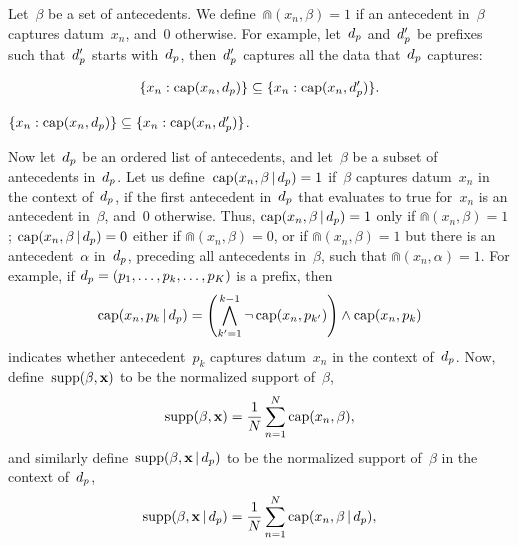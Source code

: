 Let~$\beta$ be a set of antecedents.
%
We define~${\Cap(x_n, \beta) = 1}$ if an antecedent in~$\beta$
captures datum~$x_n$, and~0 otherwise.
%
For example, let~$d_p$ and~$d_p'$ be prefixes such that~$d_p'$ starts
with~$d_p$, then~$d_p'$ captures all the data that~$d_p$ captures:
\begin{arxiv}
\begin{align}
\{x_n: \textnormal{cap}(x_n, d_p)\} \subseteq \{x_n: \textnormal{cap}(x_n, d_p')\}.
\label{eq:cap-subset}
\end{align}
\end{arxiv}
\begin{kdd}
${\{x_n: \textnormal{cap}(x_n, d_p)\} \subseteq \{x_n: \textnormal{cap}(x_n, d_p')\}}$.
\end{kdd}

Now let~$d_p$ be an ordered list of antecedents,
and let~$\beta$ be a subset of antecedents in~$d_p$.
%
Let us define~${\textnormal{cap}(x_n, \beta \,|\, d_p) = 1}$ if~$\beta$
captures datum~$x_n$ in the context of~$d_p$,
\ie if the first antecedent in~$d_p$ that evaluates to true for~$x_n$
is an antecedent in~$\beta$, and~0 otherwise.
%
Thus, ${\textnormal{cap}(x_n, \beta \,|\, d_p) = 1}$ only if ${\Cap(x_n, \beta) = 1}$;
${\textnormal{cap}(x_n, \beta \,|\, d_p) = 0}$ either if ${\Cap(x_n, \beta) = 0}$,
or if ${\Cap(x_n, \beta) = 1}$ but there is an antecedent~$\alpha$ in~$d_p$,
preceding all antecedents in~$\beta$, such that ${\Cap(x_n, \alpha) = 1}$.
%
For example, if ${d_p = (p_1, \dots, p_k, \dots, p_K)}$ is a prefix, then
\begin{align}
\textnormal{cap}(x_n, p_k \,|\, d_p) =
  \left(\bigwedge_{k'=1}^{k - 1} \neg\, \textnormal{cap}(x_n, p_{k'}) \right)
  \wedge \textnormal{cap}(x_n, p_k)
\end{align}
indicates whether antecedent~$p_k$ captures datum~$x_n$ in the context of~$d_p$.
%
Now, define~${\textnormal{supp}(\beta, \mathbf{x})}$ to be the normalized support of~$\beta$,
\begin{align}
\textnormal{supp}(\beta, \mathbf{x}) = \frac{1}{N} \sum_{n=1}^N \textnormal{cap}(x_n, \beta),
\label{eq:support}
\end{align}
and similarly define~${\textnormal{supp}(\beta, \mathbf{x} \,|\, d_p)}$
to be the normalized support of~$\beta$ in the context of~$d_p$,
\begin{align}
\textnormal{supp}(\beta, \mathbf{x} \,|\, d_p) = \frac{1}{N} \sum_{n=1}^N \textnormal{cap}(x_n, \beta \,|\, d_p),
\label{eq:support-context}
\end{align}

